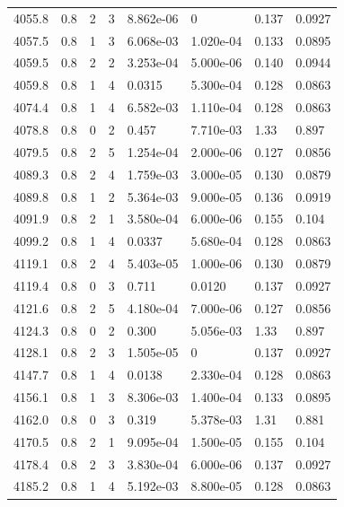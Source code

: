 \documentclass[preview]{standalone}
\begin{document}
{{{{{{{{{{{{{{{{\begin{tabular}{L{1.2cm}C{1.2cm} C{0.3cm}C{0.5cm} C{1.4cm}C{1.4cm} C{1.4cm}C{1.4cm}}
  4055.8  &   0.8  & 2     &  3 &  8.862e-06  & 0  & 0.137 &  0.0927   \\ 
  4057.5  &   0.8  & 1     &  3 &  6.068e-03  & 1.020e-04  & 0.133 &  0.0895   \\ 
  4059.5  &   0.8  & 2     &  2 &  3.253e-04  & 5.000e-06  & 0.140 &  0.0944   \\ 
  4059.8  &   0.8  & 1     &  4 &  0.0315  & 5.300e-04  & 0.128 &  0.0863   \\ 
  4074.4  &   0.8  & 1     &  4 &  6.582e-03  & 1.110e-04  & 0.128 &  0.0863   \\ 
  4078.8  &   0.8  & 0     &  2 &  0.457  & 7.710e-03  & 1.33 &  0.897   \\ 
  4079.5  &   0.8  & 2     &  5 &  1.254e-04  & 2.000e-06  & 0.127 &  0.0856   \\ 
  4089.3  &   0.8  & 2     &  4 &  1.759e-03  & 3.000e-05  & 0.130 &  0.0879   \\ 
  4089.8  &   0.8  & 1     &  2 &  5.364e-03  & 9.000e-05  & 0.136 &  0.0919   \\ 
  4091.9  &   0.8  & 2     &  1 &  3.580e-04  & 6.000e-06  & 0.155 &  0.104   \\ 
  4099.2  &   0.8  & 1     &  4 &  0.0337  & 5.680e-04  & 0.128 &  0.0863   \\ 
  4119.1  &   0.8  & 2     &  4 &  5.403e-05  & 1.000e-06  & 0.130 &  0.0879   \\ 
  4119.4  &   0.8  & 0     &  3 &  0.711  & 0.0120  & 0.137 &  0.0927   \\ 
  4121.6  &   0.8  & 2     &  5 &  4.180e-04  & 7.000e-06  & 0.127 &  0.0856   \\ 
  4124.3  &   0.8  & 0     &  2 &  0.300  & 5.056e-03  & 1.33 &  0.897   \\ 
  4128.1  &   0.8  & 2     &  3 &  1.505e-05  & 0  & 0.137 &  0.0927   \\ 
  4147.7  &   0.8  & 1     &  4 &  0.0138  & 2.330e-04  & 0.128 &  0.0863   \\ 
  4156.1  &   0.8  & 1     &  3 &  8.306e-03  & 1.400e-04  & 0.133 &  0.0895   \\ 
  4162.0  &   0.8  & 0     &  3 &  0.319  & 5.378e-03  & 1.31 &  0.881   \\ 
  4170.5  &   0.8  & 2     &  1 &  9.095e-04  & 1.500e-05  & 0.155 &  0.104   \\ 
  4178.4  &   0.8  & 2     &  3 &  3.830e-04  & 6.000e-06  & 0.137 &  0.0927   \\ 
  4185.2  &   0.8  & 1     &  4 &  5.192e-03  & 8.800e-05  & 0.128 &  0.0863   \\ 

\end{tabular}}}}}}}}}}}}}}}}}
\end{document}
